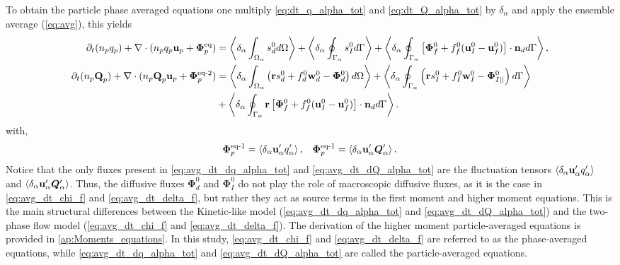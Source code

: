 To obtain the particle phase averaged equations one multiply \ref{eq:dt_q_alpha_tot} and \ref{eq:dt_Q_alpha_tot} by $\delta_\alpha$ and apply the ensemble average (\ref{eq:avg}), this yields
\begin{align}
    \partial_t (n_pq_p)
    + \mathbf{\nabla}\cdot (n_p q_p \textbf{u}_p + \bm\Phi_p^\text{eq})
    &= \left<\delta_\alpha \int_{\Omega_\alpha}  s_d^0  d\Omega\right>
    + \left<\delta_\alpha \oint_{\Gamma_\alpha}  s_I^0  d\Gamma\right>
    + \left<\delta_\alpha \oint_{\Gamma_\alpha}  \left[\mathbf{\Phi}_f^0 + f_f^0 (\textbf{u}_I^0-\textbf{u}_f^0) \right] \cdot \textbf{n}_d  d\Gamma\right>,
    \label{eq:avg_dt_dq_alpha_tot}\\
    \partial_t (n_p\textbf{Q}_p)
    + \mathbf{\nabla}\cdot (n_p \textbf{Q}_p \textbf{u}_p + \bm\Phi_p^\text{eq-2})
    &=\left<\delta_\alpha \int_{\Omega_\alpha}  \left(
        \textbf{r} s_d^0         
        + f_d^0  \textbf{w}_d^0 
        - \mathbf{\Phi}_d^0
    \right)  d\Omega\right>
    + \left<\delta_\alpha \oint_{\Gamma_\alpha}  \left(
        \textbf{r}s_I^0
        + f_I^0 \textbf{w}_I^0
        - \mathbf{\Phi}_{I||}^0
    \right)  d\Gamma\right>\nonumber\\
    &+ \left<\delta_\alpha \oint_{\Gamma_\alpha}  \textbf{r} \left[
        \mathbf{\Phi}_f^0
        + f_f^0 (\textbf{u}_I^0-\textbf{u}_f^0)
    \right]\cdot \textbf{n}_d   d\Gamma\right>.
    \label{eq:avg_dt_dQ_alpha_tot}
\end{align}
with, 
\begin{align*}
    \bm\Phi_p^\text{eq-1}= \left<\delta_\alpha \textbf{u}_\alpha' q_\alpha'\right>,
    && \bm\Phi_p^\text{eq-1}= \left<\delta_\alpha \textbf{u}_\alpha' \bm{Q}_\alpha'\right>.
\end{align*}
Notice that the only fluxes present in \ref{eq:avg_dt_dq_alpha_tot} and \ref{eq:avg_dt_dQ_alpha_tot} are the fluctuation tensors $\left<\delta_\alpha \textbf{u}_\alpha' q_\alpha'\right>$ and $\left<\delta_\alpha \textbf{u}_\alpha' \bm{Q}_\alpha'\right>$. 
Thus, the diffusive fluxes $\bm\Phi_d^0$ and $\bm\Phi_I^0$ do not play the role of macroscopic diffusive fluxes, as it is the case in \ref{eq:avg_dt_chi_f} and \ref{eq:avg_dt_delta_f}, but rather they act as source terms in the first moment and higher moment equations. 
This is the main structural differences between the Kinetic-like model (\ref{eq:avg_dt_dq_alpha_tot} and \ref{eq:avg_dt_dQ_alpha_tot}) and the two-phase flow model (\ref{eq:avg_dt_chi_f} and \ref{eq:avg_dt_delta_f}). 
The derivation of the higher moment particle-averaged equations is provided in \ref{ap:Moments_equations}. 
In this study, \ref{eq:avg_dt_chi_f} and \ref{eq:avg_dt_delta_f} are referred to as the phase-averaged equations, while \ref{eq:avg_dt_dq_alpha_tot} and \ref{eq:avg_dt_dQ_alpha_tot} are called the particle-averaged equations. 

 



